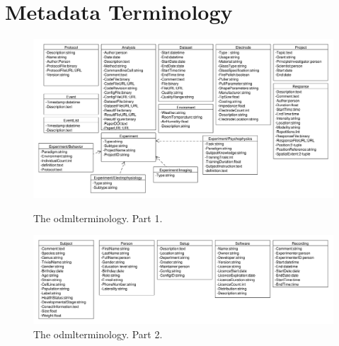 \documentclass{diplomka}
\begin{document}
\chapter{Metadata Terminology}
\label{appendix1}
\begin{figure}[h]
	\begin{center}
		\includegraphics[scale=0.40]{obrazky/odml1.pdf}
		\caption{The \gls{odml}terminology. Part 1.}
		\label{meta_scheme1}
		
			\includegraphics[scale=0.40]{obrazky/odml4.pdf}
			\caption{The \gls{odml}terminology. Part 2.}
			\label{meta_scheme2}
	\end{center}
\end{figure}
\end{document}
